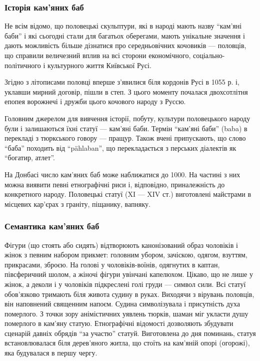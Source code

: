 \subsubsection{Історія кам'яних баб}

Не всім відомо, що половецькі скульптури, які в народі мають назву \enquote{кам'яні
баби} і які сьогодні стали для багатьох оберегами, мають унікальне значення і
дають можливість більше дізнатися про середньовічних кочовиків — половців, що
справили величезний вплив на всі сторони економічного, соціально-політичного і
культурного життя Київської Русі.

Згідно з літописами половці вперше з'явилися біля кордонів Русі в 1055 р. і,
уклавши мирний договір, пішли в степ. З цього моменту почалася двохсотлітня
епопея ворожнечі і дружби цього кочового народу з Руссю.


Головним джерелом для вивчення історії, побуту, культури половецького народу
були і залишаються їхні статуї — кам'яні баби. Термін \enquote{кам'яні баби} (baba) в
перекладі з тюркського говору — пращур. Також вчені припускають, що слово
\enquote{баба} походить від \enquote{pählaban}, що перекладається з перських діалектів як
\enquote{богатир, атлет}.

На Донбасі число кам'яних баб може наближатися до 1000. На частині з них можна
виявити певні етнографічні риси і, відповідно, приналежність до конкретного
народу. Половецькі статуї (XI — XIV ст.) виготовлені майстрами в місцевих
кар'єрах з граніту, піщанику, вапняку.

\subsubsection{Семантика кам'яних баб}

Фігури (що стоять або сидять) відтворюють канонізований образ чоловіків і жінок
з певним набором прикмет: головним убором, зачіскою, одягом, взуттям,
прикрасами, зброєю. На голові у чоловіків-воїнів, одягнутих в каптан,
півсферичний шолом, а жіночі фігури увінчані капелюхом. Цікаво, що не лише у
жінок, а деколи і у чоловіків підкреслені голі груди — символ сили. Всі статуї
обов'язково тримають біля живота судину в руках. Виходячи з вірувань половців,
він наповнений священним напоєм. Судина символізувала і присутність духа
померлого. З точки зору анімістичних уявлень тюрків, шаман міг укласти душу
померлого в кам'яну статую. Етнографічні відомості дозволяють збудувати
сценарій давніх обрядів \enquote{за участю} статуй. Виготовлена до дня поминань, статуя
встановлювалася біля дерев'яного житла, що стоїть на кам'яній опорі (огорожі),
яка будувалася в першу чергу.

